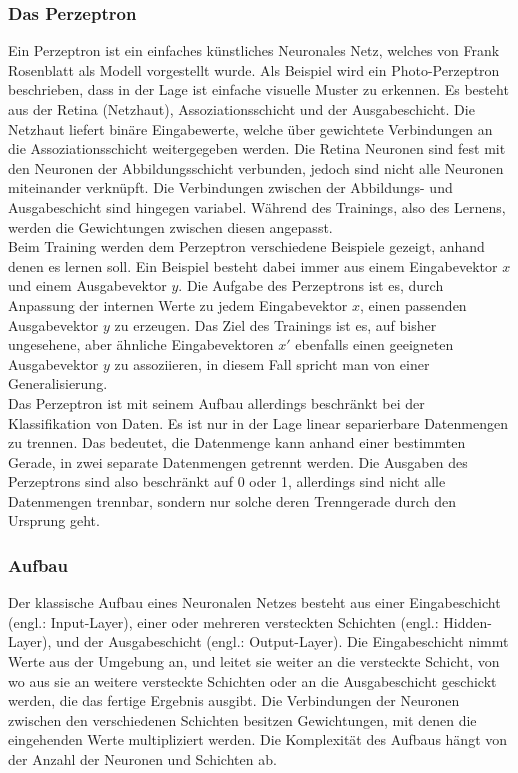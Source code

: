 \subsubsection{Das Perzeptron}
Ein Perzeptron ist ein einfaches künstliches Neuronales Netz, welches von Frank Rosenblatt als Modell vorgestellt wurde. Als Beispiel wird ein Photo-Perzeptron beschrieben, dass in der Lage ist einfache visuelle Muster zu erkennen. Es besteht aus der Retina (Netzhaut), Assoziationsschicht und der Ausgabeschicht. Die Netzhaut liefert binäre Eingabewerte, welche über gewichtete Verbindungen an die Assoziationsschicht weitergegeben werden. Die Retina Neuronen sind fest mit den Neuronen der Abbildungsschicht verbunden, jedoch sind nicht alle Neuronen miteinander verknüpft. Die Verbindungen zwischen der Abbildungs- und Ausgabeschicht sind hingegen variabel. Während des Trainings, also des Lernens, werden die Gewichtungen  zwischen diesen angepasst. \\
Beim Training werden dem Perzeptron verschiedene Beispiele gezeigt, anhand denen es lernen soll. Ein Beispiel besteht dabei immer aus einem Eingabevektor $x$ und einem Ausgabevektor $y$. Die Aufgabe des Perzeptrons ist es, durch Anpassung der internen Werte zu jedem Eingabevektor $x$, einen passenden Ausgabevektor $y$ zu erzeugen. Das Ziel des Trainings ist es, auf bisher ungesehene, aber ähnliche Eingabevektoren $x'$ ebenfalls einen geeigneten Ausgabevektor $y$ zu assoziieren, in diesem Fall spricht man von einer Generalisierung. \cite[vgl.][]{Scherer1997} \\
Das Perzeptron ist mit seinem Aufbau allerdings beschränkt bei der Klassifikation von Daten. Es ist nur in der Lage linear separierbare Datenmengen zu trennen. Das bedeutet, die Datenmenge kann anhand einer bestimmten Gerade, in zwei separate Datenmengen getrennt werden. Die Ausgaben des Perzeptrons sind also beschränkt auf 0 oder 1, allerdings sind nicht alle Datenmengen trennbar, sondern nur solche deren Trenngerade durch den Ursprung geht.\cite{Ertel2021}

\subsubsection{Aufbau}
Der klassische Aufbau eines Neuronalen Netzes besteht aus einer Eingabeschicht (engl.: Input-Layer), einer oder mehreren versteckten Schichten (engl.: Hidden-Layer), und der Ausgabeschicht (engl.: Output-Layer). Die Eingabeschicht nimmt Werte aus der Umgebung an, und leitet sie weiter an die versteckte Schicht, von wo aus sie an weitere versteckte Schichten oder an die Ausgabeschicht geschickt werden, die das fertige Ergebnis ausgibt. Die Verbindungen der Neuronen zwischen den verschiedenen Schichten besitzen Gewichtungen, mit denen die eingehenden Werte multipliziert werden. Die Komplexität des Aufbaus hängt von der Anzahl der Neuronen und Schichten ab. \cite[vgl.][]{Frochte2020}


